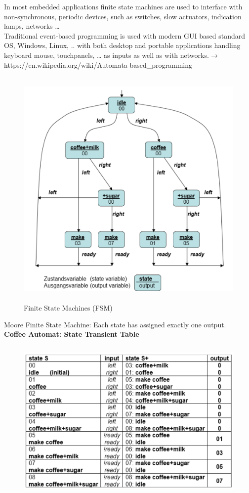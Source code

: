 In most embedded applications finite state machines are used to interface with non-synchronous, periodic devices, such as switches, slow actuators, indication lamps, networks {\dots} \\

Traditional event-based programming is used with modern GUI based standard OS, Windows, Linux, .. with both desktop and portable applications handling keyboard mouse, touchpanels, {\dots} as inputs as well as with networks.$\rightarrow$  https://en.wikipedia.org/wiki/Automata-based\_programming\\

	\begin{figure}[h]
    \centering
    \includegraphics[width=14cm, height=12cm]{Images/image158.png}
    \caption{Finite State Machines (FSM)}
    \label{fig:Fig 109}
    \end{figure}                   

Moore Finite State Machine: Each state has assigned exactly one output. \\
\newpage
\textbf{Coffee Automat: State Transient Table}

	\begin{figure}[h]
    \centering
    \includegraphics[width=12cm, height=8cm]{Images/image186.png}
    \label{fig:Fig 110}
    \end{figure} 
     
